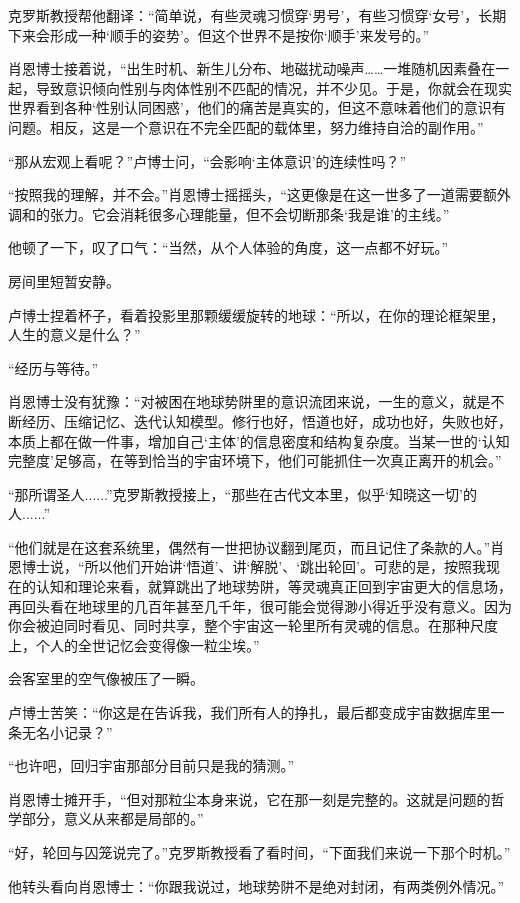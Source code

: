 克罗斯教授帮他翻译：“简单说，有些灵魂习惯穿‘男号’，有些习惯穿‘女号’，长期下来会形成一种‘顺手的姿势’。但这个世界不是按你‘顺手’来发号的。”

肖恩博士接着说，“出生时机、新生儿分布、地磁扰动噪声……一堆随机因素叠在一起，导致意识倾向性别与肉体性别不匹配的情况，并不少见。于是，你就会在现实世界看到各种‘性别认同困惑’，他们的痛苦是真实的，但这不意味着他们的意识有问题。相反，这是一个意识在不完全匹配的载体里，努力维持自洽的副作用。”

“那从宏观上看呢？”卢博士问，“会影响‘主体意识’的连续性吗？”

“按照我的理解，并不会。”肖恩博士摇摇头，“这更像是在这一世多了一道需要额外调和的张力。它会消耗很多心理能量，但不会切断那条‘我是谁’的主线。”

他顿了一下，叹了口气：“当然，从个人体验的角度，这一点都不好玩。”

房间里短暂安静。

卢博士捏着杯子，看着投影里那颗缓缓旋转的地球：“所以，在你的理论框架里，人生的意义是什么？”

“经历与等待。”

肖恩博士没有犹豫：“对被困在地球势阱里的意识流团来说，一生的意义，就是不断经历、压缩记忆、迭代认知模型。修行也好，悟道也好，成功也好，失败也好，本质上都在做一件事，增加自己‘主体’的信息密度和结构复杂度。当某一世的‘认知完整度’足够高，在等到恰当的宇宙环境下，他们可能抓住一次真正离开的机会。”

“那所谓圣人......”克罗斯教授接上，“那些在古代文本里，似乎‘知晓这一切’的人......”

“他们就是在这套系统里，偶然有一世把协议翻到尾页，而且记住了条款的人。”肖恩博士说，“所以他们开始讲‘悟道’、讲‘解脱’、‘跳出轮回’。可悲的是，按照我现在的认知和理论来看，就算跳出了地球势阱，等灵魂真正回到宇宙更大的信息场，再回头看在地球里的几百年甚至几千年，很可能会觉得渺小得近乎没有意义。因为你会被迫同时看见、同时共享，整个宇宙这一轮里所有灵魂的信息。在那种尺度上，个人的全世记忆会变得像一粒尘埃。”

会客室里的空气像被压了一瞬。

卢博士苦笑：“你这是在告诉我，我们所有人的挣扎，最后都变成宇宙数据库里一条无名小记录？”

“也许吧，回归宇宙那部分目前只是我的猜测。”

肖恩博士摊开手，“但对那粒尘本身来说，它在那一刻是完整的。这就是问题的哲学部分，意义从来都是局部的。”

“好，轮回与囚笼说完了。”克罗斯教授看了看时间，“下面我们来说一下那个时机。”

他转头看向肖恩博士：“你跟我说过，地球势阱不是绝对封闭，有两类例外情况。”

